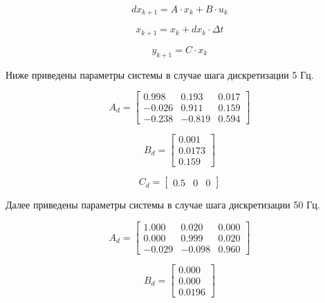 \documentclass[14pt,a4paper]{extreport}
\begin{document}
\begin{equation}
    dx_{k+1} = A \cdot x_{k} + B \cdot u_{k}
\end{equation}

\begin{equation}
    x_{k+1} = x_{k} + dx_{k} \cdot \Delta t
\end{equation}

\begin{equation}
    y_{k+1} = C \cdot x_{k}
\end{equation}

Ниже приведены параметры системы в случае шага дискретизации 5 Гц.

\begin{equation}
    A_{d} = 
    \begin{bmatrix} 
        0.998 & 0.193 & 0.017 \\ 
        -0.026 & 0.911 & 0.159 \\
        -0.238 & -0.819 & 0.594
    \end{bmatrix}
\end{equation}

\begin{equation}
    B_{d} = 
    \begin{bmatrix} 
        0.001 \\ 
        0.0173 \\
        0.159
    \end{bmatrix}
\end{equation}

\begin{equation}
    C_{d} = 
    \begin{bmatrix} 
        0.5 & 0 & 0
    \end{bmatrix}
\end{equation}

Далее приведены параметры системы в случае шага дискретизации 50 Гц.

\begin{equation}
    A_{d} = 
    \begin{bmatrix} 
        1.000 & 0.020 & 0.000 \\ 
        0.000 & 0.999 & 0.020 \\
        -0.029 & -0.098 & 0.960
    \end{bmatrix}
\end{equation}

\begin{equation}
    B_{d} = 
    \begin{bmatrix} 
        0.000 \\ 
        0.000 \\
        0.0196
    \end{bmatrix}
\end{equation}
\end{document}

